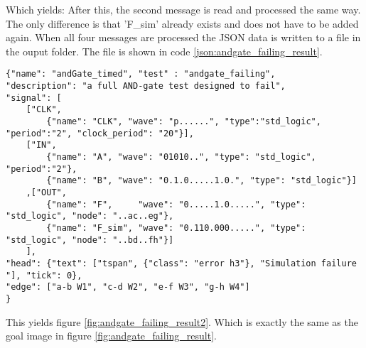 Which yields:
\nline
After this, the second message is read and processed the same way. The only difference is that 'F\_sim' already exists and does not have to be added again.
\npar
When all four messages are processed the JSON data is written to a file in the  ouput folder. The file is shown in code \ref{json:andgate_failing_result}.
\begin{lstlisting}[style=json, caption={Final content of the result file of a failing AND-gate example}, label={json:andgate_failing_result}]
{"name": "andGate_timed", "test" : "andgate_failing", 
"description": "a full AND-gate test designed to fail",
"signal": [
	["CLK",
		{"name": "CLK", "wave": "p......", "type":"std_logic", "period":"2", "clock_period": "20"}],
	["IN",
		{"name": "A", "wave": "01010..", "type": "std_logic", "period":"2"},
		{"name": "B", "wave": "0.1.0.....1.0.", "type": "std_logic"}]
	,["OUT",
		{"name": "F",     "wave": "0.....1.0.....", "type": "std_logic", "node": "..ac..eg"},
		{"name": "F_sim", "wave": "0.110.000.....", "type": "std_logic", "node": "..bd..fh"}]
	], 
"head": {"text": ["tspan", {"class": "error h3"}, "Simulation failure "], "tick": 0}, 
"edge": ["a-b W1", "c-d W2", "e-f W3", "g-h W4"]
}
\end{lstlisting}\noindent
This yields figure \ref{fig:andgate_failing_result2}.
\nline
Which is exactly the same as the goal image in figure \ref{fig:andgate_failing_result}.\newpage

